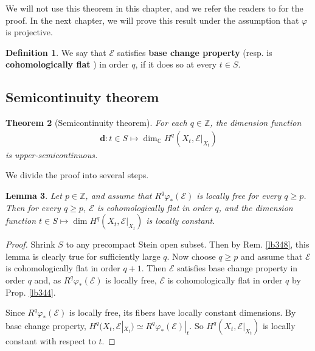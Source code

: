 \documentclass[12pt,b5paper,notitlepage]{report}
\theoremstyle{definition}
\newtheorem{df}{Definition}[section]
\theoremstyle{plain}
\newtheorem{thm}[df]{Theorem}
\newtheorem{lm}[df]{Lemma}
\newcommand{\scr}{\mathscr}
\newcommand{\mbf}{\mathbf}
\newcommand{\Cbb}{\mathbb C}
\newcommand{\Zbb}{\mathbb Z}
\numberwithin{equation}{section}
\begin{document}
We will not use this theorem in this chapter, and we refer the readers to \cite[Sec. III.4]{BS} for the proof. In the next chapter, we will prove this result under the assumption that $\varphi$ is projective. 



\begin{df}
We say that $\scr E$ satisfies \textbf{base change property} (resp. is \textbf{cohomologically flat} ) in order $q$, if it does so at every $t\in S$.  
\end{df}


 











\subsection{Semicontinuity theorem}

\begin{thm}[Semicontinuity theorem] \label{lb347}
For each $q\in\Zbb$, the dimension function
\begin{align}
\mbf d:t\in S\mapsto \dim_\Cbb H^q(X_t,\scr E|_{X_t}) \label{eq181}
\end{align}
is upper-semicontinuous.
\end{thm}

We divide the proof into several steps.



\begin{lm}\label{lb350}
Let $p\in\Zbb$, and assume that $R^q\varphi_*(\scr E)$ is locally free for every $q\geq p$. Then for every $q\geq p$, $\scr E$ is cohomologically flat in order $q$, and the dimension function $t\in S\mapsto \dim H^q(X_t,\scr E|_{X_t})$ is locally constant.
\end{lm}



\begin{proof}
Shrink $S$ to any precompact Stein open subset. Then by Rem. \ref{lb348}, this lemma is clearly true for sufficiently large $q$. Now choose $q\geq p$ and assume that $\scr E$ is cohomologically flat in order $q+1$. Then $\scr E$ satisfies base change property in order $q$ and, as $R^q\varphi_*(\scr E)$ is locally free, $\scr E$ is cohomologically flat in order $q$ by Prop. \ref{lb344}.

Since $R^q\varphi_*(\scr E)$ is locally free, its fibers have locally constant dimensions. By base change property, $H^q(X_t,\scr E|_{X_t})\simeq R^q\varphi_*(\scr E)|_t$. So $H^q(X_t,\scr E|_{X_t})$ is locally constant with respect to $t$.
\end{proof}
\end{document}
